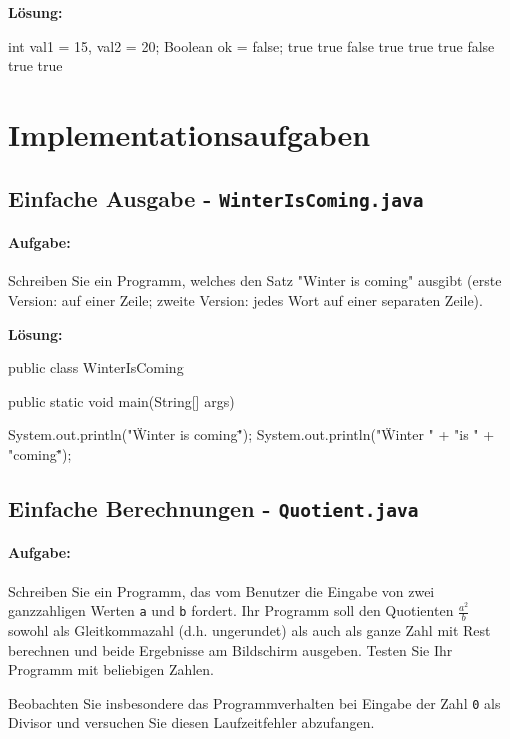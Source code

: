 \documentclass[a4paper,10pt, dvipsnames]{report}
\begin{document}
\textbf{Lösung:}

\begin{javacodebox}
int val1 = 15, val2 = 20;
Boolean ok = false;
true
true
false
true
true
true
false
true
true
\end{javacodebox}

\section{Implementationsaufgaben}

\subsection{Einfache Ausgabe - \texttt{WinterIsComing.java}}

\paragraph{Aufgabe:}
Schreiben Sie ein Programm, welches den Satz "Winter is coming" ausgibt (erste Version: auf einer Zeile; zweite Version: jedes Wort auf einer separaten Zeile).

\textbf{Lösung:}
\begin{javacodebox}
public class WinterIsComing {

    public static void main(String[] args) {

        System.out.println("\"Winter is coming\"");
        System.out.println("\"Winter \n" +
            "is \n" +
            "coming\"");
    }
}
\end{javacodebox}


\subsection{Einfache Berechnungen - \texttt{Quotient.java}}

\paragraph{Aufgabe:}
Schreiben Sie ein Programm, das vom Benutzer die Eingabe von zwei ganzzahligen Werten \texttt{a} und \texttt{b} fordert. Ihr Programm soll den Quotienten $\frac{a^2}{b}$ sowohl als Gleitkommazahl (d.h. ungerundet) als auch als ganze Zahl mit Rest berechnen und beide Ergebnisse am Bildschirm ausgeben. Testen Sie Ihr Programm mit beliebigen Zahlen.

Beobachten Sie insbesondere das Programmverhalten bei Eingabe der Zahl \texttt{0} als Divisor und versuchen Sie diesen Laufzeitfehler abzufangen.
\end{document}
